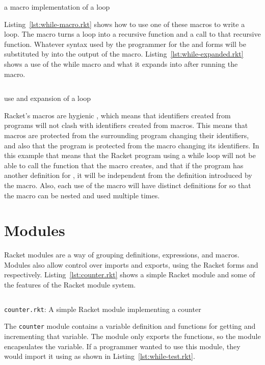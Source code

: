 \begin{listing}
  \inputminted{racket}{listings/while-macro.rkt}
  \caption{a macro implementation of a  loop}
  \label{lst:while-macro.rkt}
\end{listing}
Listing~\ref{lst:while-macro.rkt} shows how to use one of these macros to write a  loop. 
The macro turns a  loop into a recursive function and a call to that recursive function.
Whatever syntax used by the programmer for the  and  forms will be substituted by  into the output of the macro. 
Listing~\ref{lst:while-expanded.rkt} shows a use of the while macro and what it expands into after running the macro. 
\begin{listing}
  \inputminted{racket}{listings/while-expanded.rkt}
  \caption{use and expansion of a  loop}
  \label{lst:while-expanded.rkt}
\end{listing}
Racket's macros are hygienic \cite{hygiene}, which means that identifiers created from programs will not clash with identifiers created from macros. 
This means that macros are protected from the surrounding program changing their identifiers, and also that the program is protected from the macro changing its identifiers.
In this example that means that the Racket program using a while loop will not be able to call the  function that the macro creates, and that if the program has another definition for , it will be independent from the definition introduced by the macro.
Also, each use of the macro will have distinct definitions for  so that the macro can be nested and used multiple times.
\section{Modules}
Racket modules are a way of grouping definitions, expressions, and macros. 
Modules also allow control over imports and exports, using the Racket forms  and  respectively.
Listing~\ref{lst:counter.rkt} shows a simple Racket module and some of the features of the Racket module system.
\begin{listing}
  \inputminted{racket}{listings/counter.rkt}
  \caption{\texttt{counter.rkt}: A simple Racket module implementing a counter}
  \label{lst:counter.rkt}
\end{listing}
The \texttt{counter} module contains a variable definition and functions for getting and incrementing that variable.
The module only exports the functions, so the module encapsulates the variable.
If a programmer wanted to use this module, they would import it using  as shown in Listing~\ref{lst:while-test.rkt}. 


